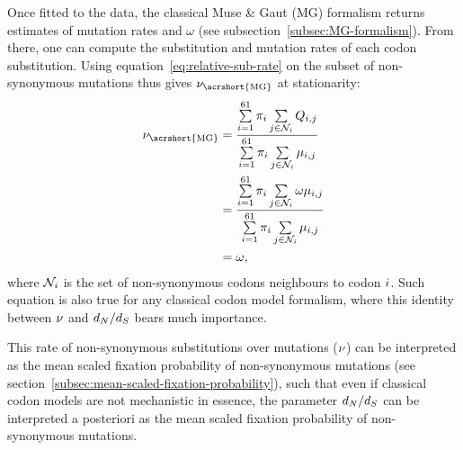 Once fitted to the data, the classical Muse \& Gaut (\acrshort{MG}) formalism returns estimates of mutation rates and $\omega$ (see subsection~\ref{subsec:MG-formalism}).
From there, one can compute the \gls{substitution} and mutation rates of each \gls{codon} \gls{substitution}.
Using equation~\ref{eq:relative-sub-rate} on the subset of \gls{non-synonymous} mutations thus gives $\avgpfix_{\text{\acrshort{MG}}}$ at stationarity:
\begin{align}
    \avgpfix_{\text{\acrshort{MG}}} & = \dfrac{ \sum\limits\sumOverCodons \subequi_{\ci} \sum\limits_{\cj \in \NonSyn_{\ci}} Q_{\itoj}}{\sum\limits\sumOverCodons \subequi_{\ci} \sum\limits_{\cj \in \NonSyn_{\ci}} \mu_{\itoj}} \\
    & = \dfrac{ \sum\limits\sumOverCodons \subequi_{\ci} \sum\limits_{\cj \in \NonSyn_{\ci}} \omega \mu_{\itoj}}{\sum\limits\sumOverCodons \subequi_{\ci} \sum\limits_{\cj \in \NonSyn_{\ci}} \mu_{\itoj}} \\
    & = \omega,
\end{align}
where $\mathcal{N}_{{i}}$ is the set of \gls{non-synonymous} \glspl{codon} neighbours to \gls{codon} ${i}$.
Such equation is also true for any classical \gls{codon} model formalism, where this identity between $\nu$ and $d_N / d_S$ bears much importance.

This rate of \gls{non-synonymous} \glspl{substitution} over mutations ($\nu$) can be interpreted as the mean scaled fixation probability of \gls{non-synonymous} mutations (see section~\ref{subsec:mean-scaled-fixation-probability}), such that even if classical \gls{codon} models are not mechanistic in essence, the parameter $d_N / d_S$ can be interpreted a posteriori as the mean scaled fixation probability of \gls{non-synonymous} mutations.

